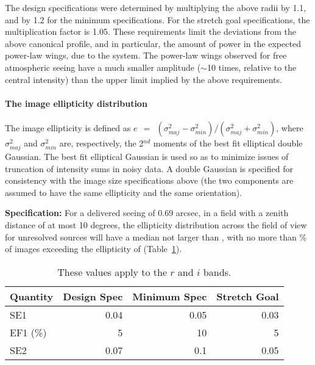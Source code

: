 The design specifications were determined by multiplying the above radii by
1.1, and by 1.2 for the minimum specifications.  For the stretch goal
specifications, the multiplication factor is 1.05.  These requirements
limit the deviations from the above canonical profile, and in particular,
the amount of power in the expected power-law wings, due to the system. The
power-law wings observed for free atmospheric seeing have a much smaller
amplitude ($\sim$10 times, relative to the central intensity) than the
upper limit implied by the above requirements.




\paragraph{The image ellipticity distribution\\}

The image ellipticity is defined as $e ~~=~~ (\sigma^{2}_{maj} -
\sigma^{2}_{min}) / (\sigma^{2}_{maj} + \sigma^{2}_{min}) $, where
$\sigma^{2}_{maj}$ and $\sigma^{2}_{min}$ are, respectively, the
2$^{nd}$ moments of the best fit elliptical double Gaussian.  The best
fit elliptical Gaussian is used so as to minimize issues of truncation
of intensity sums in noisy data.  A double Gaussian is specified for consistency
with the image size specifications above (the two components are
assumed to have the same ellipticity and the same orientation).

{\bf Specification:} For a delivered seeing of 0.69 arcsec, in a field
with a zenith distance of at most 10 degrees, the ellipticity
distribution across the field of view for unresolved sources will have
a median not larger than
,
with no more than
\% of images exceeding the ellipticity of
(Table~\ref{TellipS}).

\begin{table}[h]
\begin{tabular}{|l|r|r|r|}
\hline
Quantity       & Design Spec & Minimum Spec & Stretch Goal \\
\hline
      SE1      &    0.04      &     0.05     &       0.03    \\
      EF1 (\%) &      5       &      10      &         5     \\
      SE2      &    0.07      &     0.1      &       0.05    \\
\hline
\end{tabular}
\caption{These values apply to the $r$ and $i$ bands.}
\label{TellipS}
\end{table}

